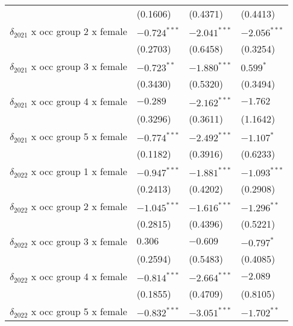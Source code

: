 \begin{tabular}{llll}
                                       &           (0.1606) &           (0.4371) &           (0.4413) \\
$\delta_{2021}$ x occ group 2 x female &     $-0.724^{***}$ &     $-2.041^{***}$ &     $-2.056^{***}$ \\
                                       &           (0.2703) &           (0.6458) &           (0.3254) \\
$\delta_{2021}$ x occ group 3 x female &      $-0.723^{**}$ &     $-1.880^{***}$ &          $0.599^*$ \\
                                       &           (0.3430) &           (0.5320) &           (0.3494) \\
$\delta_{2021}$ x occ group 4 x female &           $-0.289$ &     $-2.162^{***}$ &           $-1.762$ \\
                                       &           (0.3296) &           (0.3611) &           (1.1642) \\
$\delta_{2021}$ x occ group 5 x female &     $-0.774^{***}$ &     $-2.492^{***}$ &         $-1.107^*$ \\
                                       &           (0.1182) &           (0.3916) &           (0.6233) \\
$\delta_{2022}$ x occ group 1 x female &     $-0.947^{***}$ &     $-1.881^{***}$ &     $-1.093^{***}$ \\
                                       &           (0.2413) &           (0.4202) &           (0.2908) \\
$\delta_{2022}$ x occ group 2 x female &     $-1.045^{***}$ &     $-1.616^{***}$ &      $-1.296^{**}$ \\
                                       &           (0.2815) &           (0.4396) &           (0.5221) \\
$\delta_{2022}$ x occ group 3 x female &            $0.306$ &           $-0.609$ &         $-0.797^*$ \\
                                       &           (0.2594) &           (0.5483) &           (0.4085) \\
$\delta_{2022}$ x occ group 4 x female &     $-0.814^{***}$ &     $-2.664^{***}$ &           $-2.089$ \\
                                       &           (0.1855) &           (0.4709) &           (0.8105) \\
$\delta_{2022}$ x occ group 5 x female &     $-0.832^{***}$ &     $-3.051^{***}$ &      $-1.702^{**}$ \\

\end{tabular}
